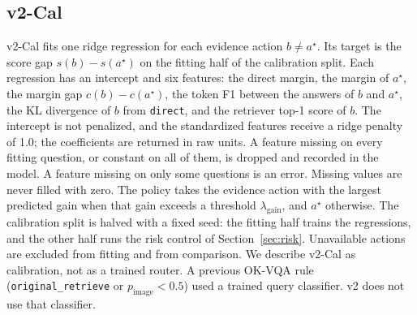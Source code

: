 \documentclass[sigconf,anonymous,review]{acmart}
\begin{document}
\subsection{v2-Cal}
\label{sec:cal}
v2-Cal fits one ridge regression for each evidence action $b\neq a^{\star}$.
Its target is the score gap $s(b)-s(a^{\star})$ on the fitting half of the calibration split.
Each regression has an intercept and six features: the direct margin, the margin of $a^{\star}$, the margin gap $c(b)-c(a^{\star})$, the token F1 between the answers of $b$ and $a^{\star}$, the KL divergence of $b$ from \texttt{direct}, and the retriever top-1 score of $b$.
The intercept is not penalized, and the standardized features receive a ridge penalty of 1.0; the coefficients are returned in raw units.
A feature missing on every fitting question, or constant on all of them, is dropped and recorded in the model.
A feature missing on only some questions is an error.
Missing values are never filled with zero.
The policy takes the evidence action with the largest predicted gain when that gain exceeds a threshold $\lambda_{\mathrm{gain}}$, and $a^{\star}$ otherwise.
The calibration split is halved with a fixed seed: the fitting half trains the regressions, and the other half runs the risk control of Section~\ref{sec:risk}.
Unavailable actions are excluded from fitting and from comparison.
We describe v2-Cal as calibration, not as a trained router.
A previous OK-VQA rule (\texttt{original\_retrieve} or $p_{\mathrm{image}}<0.5$) used a trained query classifier.
v2 does not use that classifier.
\end{document}
